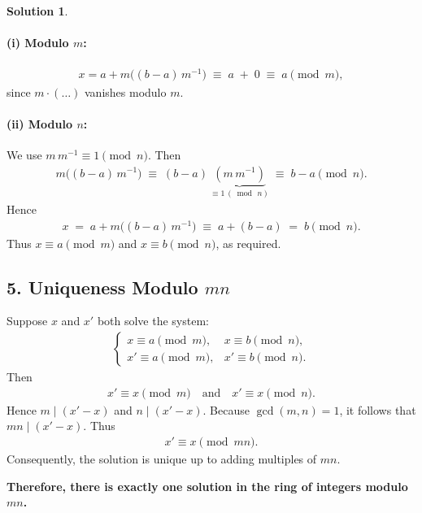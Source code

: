 \documentclass[12pt]{article}
\theoremstyle{definition} %
\newtheorem{solution}{Solution}
\theoremstyle{plain} %
\begin{document}
\begin{solution}
\paragraph{(i) Modulo $m$:}
\begin{align}
x = a + m \bigl((b-a)\,m^{-1}\bigr) 
\;\equiv\; a \;+\; 0
\;\equiv\; a 
\pmod{m},
\end{align}
since $m\cdot(\dots)$ vanishes modulo $m$.

\paragraph{(ii) Modulo $n$:}
We use $m\,m^{-1} \equiv 1 \pmod{n}$. Then
\begin{align}
m \bigl((b-a)\,m^{-1}\bigr) 
\;\equiv\; (b-a)\,\underbrace{(m \,m^{-1})}_{\equiv 1 \,(\bmod\,n)} 
\;\equiv\; b-a \pmod{n}.
\end{align}
Hence
\begin{align}
x 
\;=\;
a + m\bigl((b-a)\,m^{-1}\bigr)
\;\equiv\; 
a + (b-a)
\;=\;
b \pmod{n}.
\end{align}
Thus $x\equiv a \pmod{m}$ and $x\equiv b \pmod{n}$, as required.

\subsection*{5. Uniqueness Modulo $mn$}

Suppose $x$ and $x'$ both solve the system:
\begin{align}
\begin{cases}
x \equiv a \pmod{m}, & x \equiv b \pmod{n},\\
x' \equiv a \pmod{m}, & x' \equiv b \pmod{n}.
\end{cases}
\end{align}
Then
\begin{align}
x' \equiv x \pmod{m}
\quad\text{and}\quad
x' \equiv x \pmod{n}.
\end{align}
Hence $m\mid (x'-x)$ and $n\mid (x'-x)$.  Because $\gcd(m,n) = 1$, it follows that $mn \mid (x'-x)$. Thus
\begin{align}
x' \equiv x \pmod{mn}.
\end{align}
Consequently, the solution is unique up to adding multiples of $mn$. 

\medskip

\noindent
\textbf{Therefore, there is exactly one solution in the ring of integers modulo $mn$.}

\end{solution}
\end{document}
